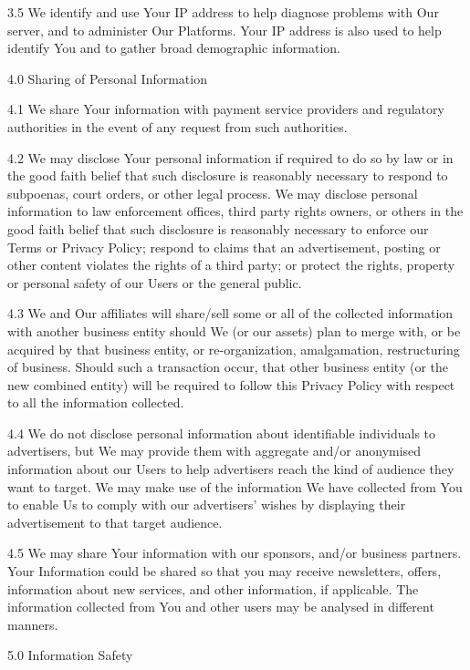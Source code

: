 3.5      We identify and use Your IP address to help diagnose problems with Our server, and to administer Our Platforms. Your IP address is also used to help identify You and to gather broad demographic information.

 

4.0      Sharing of Personal Information

4.1      We share Your information with payment service providers and regulatory authorities in the event of any request from such authorities.

4.2      We may disclose Your personal information if required to do so by law or in the good faith belief that such disclosure is reasonably necessary to respond to subpoenas, court orders, or other legal process. We may disclose personal information to law enforcement offices, third party rights owners, or others in the good faith belief that such disclosure is reasonably necessary to enforce our Terms or Privacy Policy; respond to claims that an advertisement, posting or other content violates the rights of a third party; or protect the rights, property or personal safety of our Users or the general public.

4.3      We and Our affiliates will share/sell some or all of the collected information with another business entity should We (or our assets) plan to merge with, or be acquired by that business entity, or re-organization, amalgamation, restructuring of business. Should such a transaction occur, that other business entity (or the new combined entity) will be required to follow this Privacy Policy with respect to all the information collected.

4.4      We do not disclose personal information about identifiable individuals to advertisers, but We may provide them with aggregate and/or anonymised information about our Users to help advertisers reach the kind of audience they want to target. We may make use of the information We have collected from You to enable Us to comply with our advertisers’ wishes by displaying their advertisement to that target audience.

4.5      We may share Your information with our sponsors, and/or business partners. Your Information could be shared so that you may receive newsletters, offers, information about new services, and other information, if applicable. The information collected from You and other users may be analysed in different manners.

 

5.0      Information Safety

